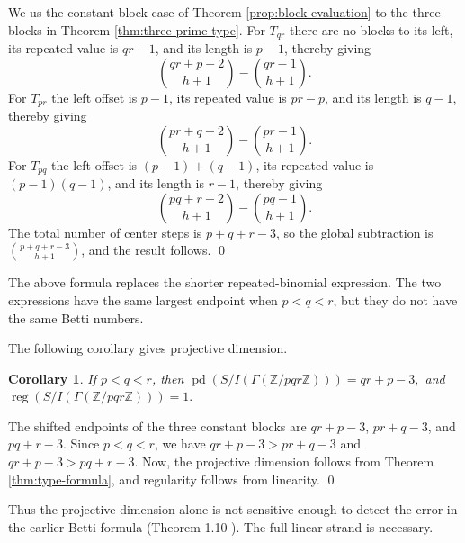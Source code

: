 \documentclass[12pt]{article}
\newtheorem{corollary}[theorem]{Corollary}
\theoremstyle{definition}
\renewenvironment{proof}{{\bf \noindent Proof.}}{\qed}
\begin{document}
\begin{proof}
We us the constant-block case of Theorem \ref{prop:block-evaluation} to the three blocks in Theorem \ref{thm:three-prime-type}.  For $T_{qr}$ there are no blocks to its left, its repeated value is $qr-1$, and its length is $p-1$, thereby giving
$$
\binom{qr+p-2}{h+1}-\binom{qr-1}{h+1}.
$$
For $T_{pr}$ the left offset is $p-1$, its repeated value is $pr-p$, and its length is $q-1$, thereby giving
$$
\binom{pr+q-2}{h+1}-\binom{pr-1}{h+1}.
$$
For $T_{pq}$ the left offset is $(p-1)+(q-1)$, its repeated value is $(p-1)(q-1)$, and its length is $r-1$, thereby giving
$$
\binom{pq+r-2}{h+1}-\binom{pq-1}{h+1}.
$$
The total number of center steps is $p+q+r-3$, so the global subtraction is $\binom{p+q+r-3}{h+1}$, and the result follows.
\end{proof}

\medskip

The above formula replaces the shorter repeated-binomial expression.  The two expressions have the same largest endpoint when $p<q<r$, but they do not have the same Betti numbers.

\medskip

\noindent The following corollary gives projective dimension.
\begin{corollary}\label{cor:three-prime-pd}
If $p<q<r$, then
$
\operatorname{pd}(S/I(\Gamma(\mathbb{Z}/pqr\mathbb{Z})))=qr+p-3,$ and $ 
\operatorname{reg}(S/I(\Gamma(\mathbb{Z}/pqr\mathbb{Z})))=1. $
\end{corollary}

\begin{proof}
The shifted endpoints of the three constant blocks are $qr+p-3$, $pr+q-3$, and $pq+r-3$.  Since $p<q<r$, we have 
$ qr+p-3>pr+q-3 $
and $
qr+p-3>pq+r-3. $
Now, the projective dimension follows from Theorem \ref{thm:type-formula}, and regularity follows from linearity.
\end{proof}

\medskip

Thus the projective dimension alone is not sensitive enough to detect the error in the earlier Betti formula (Theorem 1.10 \cite{DungVu2026}).  The full linear strand is necessary.


\medskip
\end{document}
